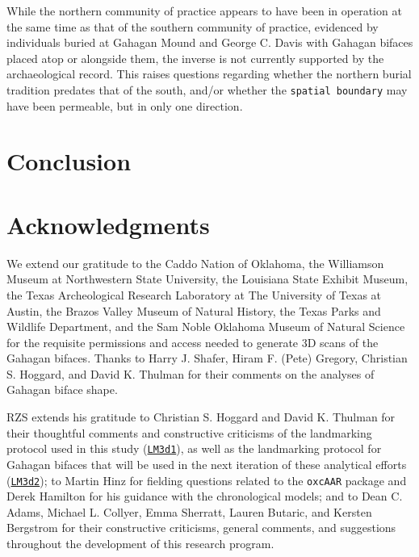 \documentclass[]{interact}
\theoremstyle{plain}%
\theoremstyle{definition}
\theoremstyle{remark}
\begin{document}
While the northern community of practice appears to have been in
operation at the same time as that of the southern community of
practice, evidenced by individuals buried at Gahagan Mound and George C.
Davis with Gahagan bifaces placed atop or alongside them, the inverse is
not currently supported by the archaeological record. This raises
questions regarding whether the northern burial tradition predates that
of the south, and/or whether the \texttt{spatial\ boundary} may have
been permeable, but in only one direction.

\hypertarget{conclusion}{%
\section{Conclusion}\label{conclusion}}

\hypertarget{acknowledgments}{%
\section*{Acknowledgments}\label{acknowledgments}}

We extend our gratitude to the Caddo Nation of Oklahoma, the Williamson
Museum at Northwestern State University, the Louisiana State Exhibit
Museum, the Texas Archeological Research Laboratory at The University of
Texas at Austin, the Brazos Valley Museum of Natural History, the Texas
Parks and Wildlife Department, and the Sam Noble Oklahoma Museum of
Natural Science for the requisite permissions and access needed to
generate 3D scans of the Gahagan bifaces. Thanks to Harry J. Shafer,
Hiram F. (Pete) Gregory, Christian S. Hoggard, and David K. Thulman for
their comments on the analyses of Gahagan biface shape.

RZS extends his gratitude to Christian S. Hoggard and David K. Thulman
for their thoughtful comments and constructive criticisms of the
landmarking protocol used in this study
(\href{https://github.com/aksel-blaise/gahaganmorph2/blob/master/analysis/landmarking-protocol.md}{\texttt{LM3d1}}),
as well as the landmarking protocol for Gahagan bifaces that will be
used in the next iteration of these analytical efforts
(\href{https://seldenlab.github.io/gahaganmorph.3/landmarking-protocol-3d2.html}{\texttt{LM3d2}});
to Martin Hinz for fielding questions related to the \texttt{oxcAAR}
package and Derek Hamilton for his guidance with the chronological
models; and to Dean C. Adams, Michael L. Collyer, Emma Sherratt, Lauren
Butaric, and Kersten Bergstrom for their constructive criticisms,
general comments, and suggestions throughout the development of this
research program.
\end{document}
